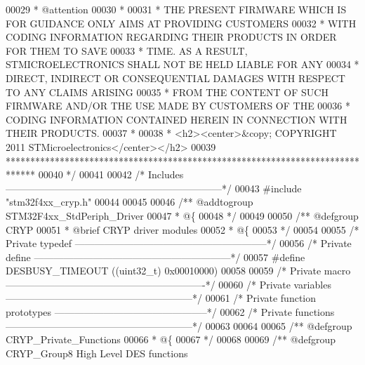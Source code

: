 \begin{DoxyCode}
00029 \textcolor{comment}{  * @attention}
00030 \textcolor{comment}{  *}
00031 \textcolor{comment}{  * THE PRESENT FIRMWARE WHICH IS FOR GUIDANCE ONLY AIMS AT PROVIDING CUSTOMERS}
00032 \textcolor{comment}{  * WITH CODING INFORMATION REGARDING THEIR PRODUCTS IN ORDER FOR THEM TO SAVE}
00033 \textcolor{comment}{  * TIME. AS A RESULT, STMICROELECTRONICS SHALL NOT BE HELD LIABLE FOR ANY}
00034 \textcolor{comment}{  * DIRECT, INDIRECT OR CONSEQUENTIAL DAMAGES WITH RESPECT TO ANY CLAIMS ARISING}
00035 \textcolor{comment}{  * FROM THE CONTENT OF SUCH FIRMWARE AND/OR THE USE MADE BY CUSTOMERS OF THE}
00036 \textcolor{comment}{  * CODING INFORMATION CONTAINED HEREIN IN CONNECTION WITH THEIR PRODUCTS.}
00037 \textcolor{comment}{  *}
00038 \textcolor{comment}{  * <h2><center>&copy; COPYRIGHT 2011 STMicroelectronics</center></h2>}
00039 \textcolor{comment}{  ******************************************************************************}
00040 \textcolor{comment}{  */}
00041 
00042 \textcolor{comment}{/* Includes ------------------------------------------------------------------*/}
00043 \textcolor{preprocessor}{#}\textcolor{preprocessor}{include} "stm32f4xx_cryp.h"
00044 
00045 
00046 \textcolor{comment}{/** @addtogroup STM32F4xx\_StdPeriph\_Driver}
00047 \textcolor{comment}{  * @\{}
00048 \textcolor{comment}{  */}
00049 
00050 \textcolor{comment}{/** @defgroup CRYP }
00051 \textcolor{comment}{  * @brief CRYP driver modules}
00052 \textcolor{comment}{  * @\{}
00053 \textcolor{comment}{  */}
00054 
00055 \textcolor{comment}{/* Private typedef -----------------------------------------------------------*/}
00056 \textcolor{comment}{/* Private define ------------------------------------------------------------*/}
00057 \textcolor{preprocessor}{#}\textcolor{preprocessor}{define} \textcolor{preprocessor}{DESBUSY\_TIMEOUT}    \textcolor{preprocessor}{(}\textcolor{preprocessor}{(}\textcolor{preprocessor}{uint32\_t}\textcolor{preprocessor}{)} 0x00010000\textcolor{preprocessor}{)}
00058 
00059 \textcolor{comment}{/* Private macro -------------------------------------------------------------*/}
00060 \textcolor{comment}{/* Private variables ---------------------------------------------------------*/}
00061 \textcolor{comment}{/* Private function prototypes -----------------------------------------------*/}
00062 \textcolor{comment}{/* Private functions ---------------------------------------------------------*/}
00063 
00064 
00065 \textcolor{comment}{/** @defgroup CRYP\_Private\_Functions}
00066 \textcolor{comment}{  * @\{}
00067 \textcolor{comment}{  */}
00068 
00069 \textcolor{comment}{/** @defgroup CRYP\_Group8 High Level DES functions}

\end{DoxyCode}
